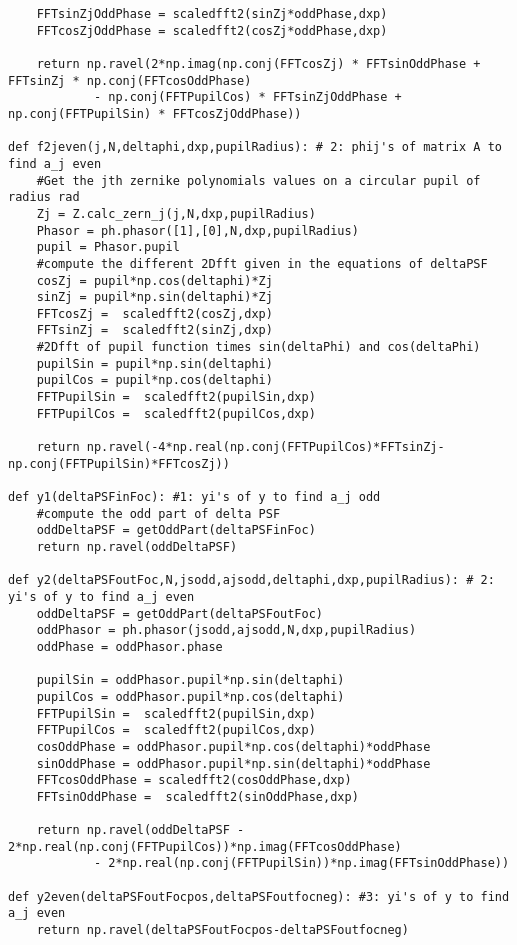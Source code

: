 \begin{lstlisting}
    FFTsinZjOddPhase = scaledfft2(sinZj*oddPhase,dxp)
    FFTcosZjOddPhase = scaledfft2(cosZj*oddPhase,dxp)

    return np.ravel(2*np.imag(np.conj(FFTcosZj) * FFTsinOddPhase + FFTsinZj * np.conj(FFTcosOddPhase)
            - np.conj(FFTPupilCos) * FFTsinZjOddPhase + np.conj(FFTPupilSin) * FFTcosZjOddPhase))
            
def f2jeven(j,N,deltaphi,dxp,pupilRadius): # 2: phij's of matrix A to find a_j even
    #Get the jth zernike polynomials values on a circular pupil of radius rad
    Zj = Z.calc_zern_j(j,N,dxp,pupilRadius)
    Phasor = ph.phasor([1],[0],N,dxp,pupilRadius)
    pupil = Phasor.pupil
    #compute the different 2Dfft given in the equations of deltaPSF
    cosZj = pupil*np.cos(deltaphi)*Zj
    sinZj = pupil*np.sin(deltaphi)*Zj
    FFTcosZj =  scaledfft2(cosZj,dxp)
    FFTsinZj =  scaledfft2(sinZj,dxp)
    #2Dfft of pupil function times sin(deltaPhi) and cos(deltaPhi)
    pupilSin = pupil*np.sin(deltaphi)
    pupilCos = pupil*np.cos(deltaphi)
    FFTPupilSin =  scaledfft2(pupilSin,dxp)
    FFTPupilCos =  scaledfft2(pupilCos,dxp)

    return np.ravel(-4*np.real(np.conj(FFTPupilCos)*FFTsinZj-np.conj(FFTPupilSin)*FFTcosZj))

def y1(deltaPSFinFoc): #1: yi's of y to find a_j odd
    #compute the odd part of delta PSF
    oddDeltaPSF = getOddPart(deltaPSFinFoc)
    return np.ravel(oddDeltaPSF)

def y2(deltaPSFoutFoc,N,jsodd,ajsodd,deltaphi,dxp,pupilRadius): # 2: yi's of y to find a_j even
    oddDeltaPSF = getOddPart(deltaPSFoutFoc)
    oddPhasor = ph.phasor(jsodd,ajsodd,N,dxp,pupilRadius)
    oddPhase = oddPhasor.phase

    pupilSin = oddPhasor.pupil*np.sin(deltaphi)
    pupilCos = oddPhasor.pupil*np.cos(deltaphi)
    FFTPupilSin =  scaledfft2(pupilSin,dxp)
    FFTPupilCos =  scaledfft2(pupilCos,dxp)
    cosOddPhase = oddPhasor.pupil*np.cos(deltaphi)*oddPhase
    sinOddPhase = oddPhasor.pupil*np.sin(deltaphi)*oddPhase
    FFTcosOddPhase = scaledfft2(cosOddPhase,dxp)
    FFTsinOddPhase =  scaledfft2(sinOddPhase,dxp)

    return np.ravel(oddDeltaPSF - 2*np.real(np.conj(FFTPupilCos))*np.imag(FFTcosOddPhase)
            - 2*np.real(np.conj(FFTPupilSin))*np.imag(FFTsinOddPhase))
            
def y2even(deltaPSFoutFocpos,deltaPSFoutfocneg): #3: yi's of y to find a_j even
    return np.ravel(deltaPSFoutFocpos-deltaPSFoutfocneg)
    

\end{lstlisting}
